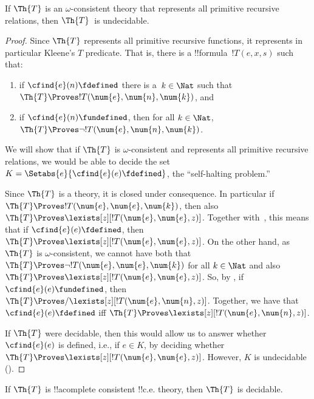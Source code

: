 \documentclass[../../../include/open-logic-section]{subfiles}
\begin{document}

\begin{thm}
If $\Th{T}$ is an $\omega$-consistent theory that represents all
primitive recursive relations, then $\Th{T}$~is undecidable.
\end{thm}

\begin{proof}
  Since $\Th{T}$ represents all primitive recursive functions, it
  represents in particular Kleene's $T$ predicate. That is, there is a
  !!{formula}~$!T(e, x, s)$ such that:
  \begin{enumerate}
    \item{} if $\cfind{e}(n) \fdefined$ there is a~$k \in \Nat$ such
    that $\Th{T} \Proves !T(\num{e}, \num{n}, \num{k})$, and
    \item{} if $\cfind{e}(n) \fundefined$, then for all $k \in \Nat$,
    $\Th{T} \Proves \lnot !T(\num{e}, \num{n}, \num{k})$.
  \end{enumerate}
  We will show that if $\Th{T}$ is $\omega$-consistent and represents
  all primitive recursive relations, we would be able to decide the
  set $K = \Setabs{e}{\cfind{e}(e) \fdefined}$, the ``self-halting
  problem.'' 

  Since $\Th{T}$ is a theory, it is closed under consequence. In
  particular if $\Th{T} \Proves !T(\num{e}, \num{e}, \num{k})$, then
  also $\Th{T} \Proves \lexists[z][!T(\num{e}, \num{e}, z)]$. Together
  with~, this means that if $\cfind{e}(e) \fdefined$,
  then $\Th{T} \Proves \lexists[z][!T(\num{e}, \num{e}, z)]$. On the
  other hand, as $\Th{T}$ is $\omega$-consistent, we cannot have both
  that $\Th{T} \Proves \lnot !T(\num{e}, \num{e}, \num{k})$ for all $k
  \in \Nat$ and also $\Th{T} \Proves \lexists[z][!T(\num{e}, \num{e},
  z)]$. So, by , if $\cfind{e}(e) \fundefined$, then $\Th{T} \Proves/
  \lexists[z][!T(\num{e}, \num{n}, z)]$. Together, we have that
  $\cfind{e}(e) \fdefined$ iff $\Th{T} \Proves \lexists[z][!T(\num{e},
  \num{n}, z)]$.

  If $\Th{T}$ were decidable, then this would allow us to answer
  whether $\cfind{e}(e)$ is defined, i.e., if $e \in K$, by deciding
  whether $\Th{T} \Proves \lexists[z][!T(\num{e}, \num{e}, z)]$.
  However, $K$ is undecidable ().
\end{proof}

\begin{thm}
  If\/ $\Th{T}$ is !!a{complete} consistent !!{c.e.} theory, then
  $\Th{T}$ is decidable.
\end{thm}
\end{document}
